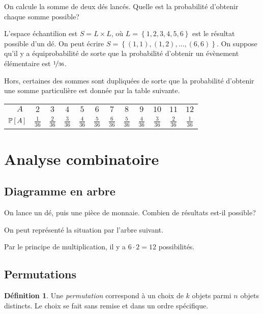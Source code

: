 \documentclass[11pt]{article}
\makeatletter
\renewcommand\P[1]{%
	\ensuremath{%
		\mathbb{P}\left[\,#1\,\right]%
	}%
}%
\theoremstyle{remark}
\theoremstyle{definition}
\newtheorem*{@definition}{Définition}
\newenvironment{definition}{%
	\begin{@definition}%
}{%
	\end{@definition}%
	\setcounter{property}{0}%
}
\makeatother
\begin{document}
\begin{exemple}
	On calcule la somme de deux dés lancés. Quelle est la probabilité d'obtenir
	chaque somme possible?
	
	L'espace échantilion est $S=L\times L$, où $L=\left\{1,2,3,4,5,6\right\}$
	est le résultat possible d'un dé. On peut écrire
	$S=\left\{(1,1),(1,2),\dots,(6,6)\right\}$. On suppose qu'il y a
	équiprobabilité de sorte que la probabilité d'obtenir un évènement
	élémentaire est $\nicefrac{1}{36}$.

	Hors, certaines des sommes sont dupliquées de sorte que la probabilité
	d'obtenir une somme particulière est donnée par la table suivante.
	\begin{table}[H]
		\centering
		\begin{tabular}{r|ccccccccccc}
			$\phantom{\mathbb{P}(}A\phantom{)}$ &
			$2$ & $3$ & $4$ & $5$ & $6$ & $7$ & $8$ & $9$ & $10$ & $11$ & $12$\\
			$\P{A}$ &
			$\frac{1}{36}$ & $\frac{2}{36}$ & $\frac{3}{36}$ & $\frac{4}{36}$ &
			$\frac{5}{36}$ & $\frac{6}{36}$ & $\frac{5}{36}$ & $\frac{4}{36}$ &
			$\frac{3}{36}$ & $\frac{2}{36}$ & $\frac{1}{36}$\\
		\end{tabular}
	\end{table}
\end{exemple}

\section{Analyse combinatoire}
\subsection{Diagramme en arbre}

\begin{exemple}
	On lance un dé, puis une pièce de monnaie. Combien de résultats est-il
	possible?
	
	On peut représenté la situation par l'arbre suivant.
	\begin{figure}[H]
		\centering
		
	\end{figure}
	Par le principe de multiplication, il y a $6\cdot 2=12$ possibilités.
\end{exemple}

\subsection{Permutations}
\begin{definition}
	Une \textit{permutation} correspond à un choix de $k$ objets parmi $n$
	objets distincts. Le choix se fait sans remise et dans un ordre spécifique.
\end{definition}
\end{document}
